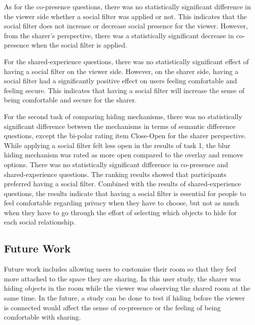 As for the co-presence questions, there was no statistically significant difference in the viewer side whether a social filter was applied or not. This indicates that the social filter does not increase or decrease social presence for the viewer. However, from the sharer's perspective, there was a statistically significant decrease in co-presence when the social filter is applied. 

For the shared-experience questions, there was no statistically significant effect of having a social filter on the viewer side. However, on the sharer side, having a social filter had a significantly positive effect on users feeling comfortable and feeling secure. This indicates that having a social filter will increase the sense of being comfortable and secure for the sharer. 

For the second task of comparing hiding mechanisms, there was no statistically significant difference between the mechanisms in terms of semantic difference questions, except the bi-polar rating item Close-Open for the sharer perspective. While applying a social filter felt less open in the results of task 1, the blur hiding mechanism was rated as more open compared to the overlay and remove options. There was no statistically significant difference in co-presence and shared-experience questions. 
The ranking results showed that participants preferred having a social filter. Combined with the results of shared-experience questions, the results indicate that having a social filter is essential for people to feel comfortable regarding privacy when they have to choose, but not as much when they have to go through the effort of selecting which objects to hide for each social relationship. 

\subsection{Future Work}

Future work includes allowing users to customise their room so that they feel more attached to the space they are sharing. In this user study, the sharer was hiding objects in the room while the viewer was observing the shared room at the same time. In the future, a study can be done to test if hiding before the viewer is connected would affect the sense of co-presence or the feeling of being comfortable with sharing.

